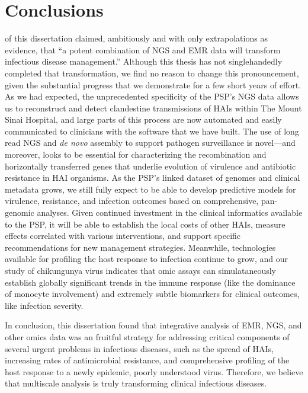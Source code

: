 \section{Conclusions}

 of this dissertation claimed, ambitiously and with only extrapolations as evidence, that ``a potent combination of NGS and EMR data will transform infectious disease management.'' Although this thesis has not singlehandedly completed that transformation, we find no reason to change this pronouncement, given the substantial progress that we demonstrate for a few short years of effort. As we had expected, the unprecedented specificity of the PSP's NGS data allows us to reconstruct and detect clandestine transmissions of HAIs within The Mount Sinai Hospital, and large parts of this process are now automated and easily communicated to clinicians with the software that we have built. The use of long read NGS and \emph{de novo} assembly to support pathogen surveillance is novel—and moreover, looks to be essential for characterizing the recombination and horizontally transferred genes that underlie evolution of virulence and antibiotic resistance in HAI organisms. As the PSP's linked dataset of genomes and clinical metadata grows, we still fully expect to be able to develop predictive models for virulence, resistance, and infection outcomes based on comprehensive, pan-genomic analyses. Given continued investment in the clinical informatics available to the PSP, it will be able to establish the local costs of other HAIs, measure effects correlated with various interventions, and support specific recommendations for new management strategies. Meanwhile, technologies available for profiling the host response to infection continue to grow, and our study of chikungunya virus indicates that omic assays can simulataneously establish globally significant trends in the immune response (like the dominance of monocyte involvement) and extremely subtle biomarkers for clinical outcomes, like infection severity.

In conclusion, this dissertation found that integrative analysis of EMR, NGS, and other omics data was an fruitful strategy for addressing critical components of several urgent problems in infectious diseases, such as the spread of HAIs, increasing rates of antimicrobial resistance, and comprehensive profiling of the host response to a newly epidemic, poorly understood virus. Therefore, we believe that multiscale analysis is truly transforming clinical infectious diseases.